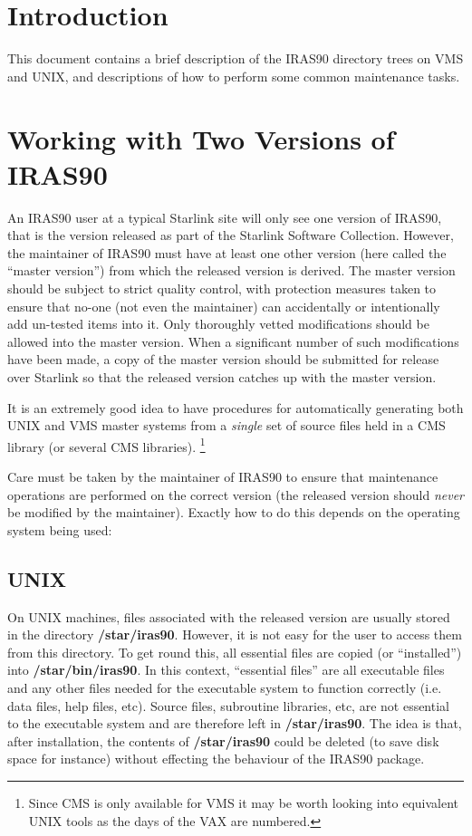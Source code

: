 \setlength{\parskip}{0mm} \tableofcontents
\setlength{\parskip}{\medskipamount} \markright{\stardocname}

\section{Introduction}
This document contains a brief description of the {\small IRAS90} directory
trees on {\small VMS} and {\small UNIX}, and descriptions of how to perform some
common maintenance tasks. 

\section{Working with Two Versions of IRAS90}
An {\small IRAS90} user at a typical Starlink site will only see one version of
{\small IRAS90}, that is the version released as part of the Starlink Software
Collection. However, the maintainer of {\small IRAS90} must have at least one
other version (here called the ``master version'') from which the released
version is derived. The master version should be subject to strict quality
control, with protection measures taken to ensure that no-one (not even the
maintainer) can accidentally or intentionally add un-tested items into it. Only
thoroughly vetted modifications should be allowed into the master version. When
a significant number of such modifications have been made, a copy of the master
version should be submitted for release over Starlink so that the released
version catches up with the master version. 

It is an extremely good idea to have procedures for automatically generating
both {\small UNIX} and {\small VMS} master systems from a {\em single} set of
source files held in a {\small CMS} library (or several {\small CMS} libraries).
\footnote{Since {\small CMS} is only available for {\small VMS} it may be worth
looking into equivalent {\small UNIX} tools as the days of the {\small VAX} are
numbered.} 

Care must be taken by the maintainer of {\small IRAS90} to ensure that
maintenance operations are performed on the correct version (the released
version should {\em never} be modified by the maintainer). Exactly how to do
this depends on the operating system being used: 

\subsection{UNIX}
On {\small UNIX} machines, files associated with the released version
are usually stored in the directory {\bf /star/iras90}. However, it is not easy
for the user to access them from this directory. To get round this, all
essential files are copied (or ``installed'') into {\bf /star/bin/iras90}. In
this context, ``essential files'' are all executable files and any other files
needed for the executable system to function correctly (i.e. data files, help
files, etc). Source files, subroutine libraries, etc, are not essential to the
executable system and are therefore left in {\bf /star/iras90}. The idea is
that, after installation, the contents of {\bf /star/iras90} could be deleted
(to save disk space for instance) without effecting the behaviour of the {\small
IRAS90} package. 

